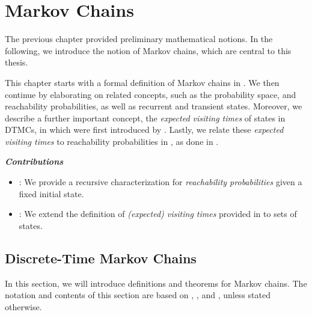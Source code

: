 \chapter{Markov Chains}
\label{ch:Markov Chains}

The previous chapter provided preliminary mathematical notions. In the following, we introduce the notion of Markov chains, which are central to this thesis.

This chapter starts with a formal definition of Markov chains in . We then continue by elaborating on related concepts, such as the probability space, and reachability probabilities, as well as recurrent and transient states. Moreover, we describe a further important concept, the \textit{expected visiting times} of states in DTMCs, in  which were first introduced by \cite{KemenySnellBook}.
Lastly, we relate these \textit{expected visiting times} to reachability probabilities in , as done in \cite{Baier_Relating_Reach_Prob,Computing_EVTs_Stationary_Distr_in_MCs_Mertens}.

\emph{\textbf{Contributions}}
\begin{itemize}
    \item {}: We provide a recursive characterization for \textit{reachability probabilities} given a fixed initial state.
    \item {}: We extend the definition of \textit{(expected) visiting times} provided in \cite{Computing_EVTs_Stationary_Distr_in_MCs_Mertens} to sets of states.
\end{itemize}

\section{Discrete-Time Markov Chains}\label{sec:DTMCs}
In this section, we will introduce definitions and theorems for Markov chains. The notation and contents of this section are based on \cite{Bibel}, \cite{Computing_EVTs_Stationary_Distr_in_MCs_Mertens}, and \cite{Semantics_Model-Checking_omega-Regular}, unless stated otherwise.


